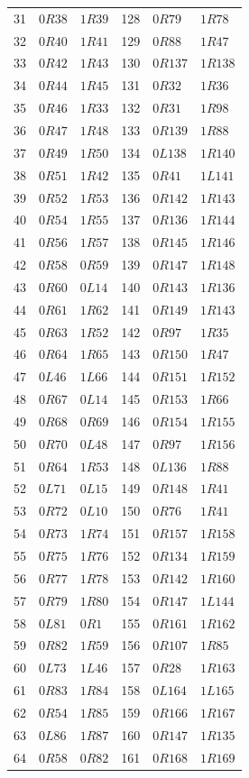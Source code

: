 \begin{longtable}{rll@{\hspace{1.6cm}}rll}
31&$0R38$&$1R39$&128&$0R79$&$1R78$\\
32&$0R40$&$1R41$&129&$0R88$&$1R47$\\
33&$0R42$&$1R43$&130&$0R137$&$1R138$\\
34&$0R44$&$1R45$&131&$0R32$&$1R36$\\
35&$0R46$&$1R33$&132&$0R31$&$1R98$\\
36&$0R47$&$1R48$&133&$0R139$&$1R88$\\
37&$0R49$&$1R50$&134&$0L138$&$1R140$\\
38&$0R51$&$1R42$&135&$0R41$&$1L141$\\
39&$0R52$&$1R53$&136&$0R142$&$1R143$\\
40&$0R54$&$1R55$&137&$0R136$&$1R144$\\
41&$0R56$&$1R57$&138&$0R145$&$1R146$\\
42&$0R58$&$0R59$&139&$0R147$&$1R148$\\
43&$0R60$&$0L14$&140&$0R143$&$1R136$\\
44&$0R61$&$1R62$&141&$0R149$&$1R143$\\
45&$0R63$&$1R52$&142&$0R97$&$1R35$\\
46&$0R64$&$1R65$&143&$0R150$&$1R47$\\
47&$0L46$&$1L66$&144&$0R151$&$1R152$\\
48&$0R67$&$0L14$&145&$0R153$&$1R66$\\
49&$0R68$&$0R69$&146&$0R154$&$1R155$\\
50&$0R70$&$0L48$&147&$0R97$&$1R156$\\
51&$0R64$&$1R53$&148&$0L136$&$1R88$\\
52&$0L71$&$0L15$&149&$0R148$&$1R41$\\
53&$0R72$&$0L10$&150&$0R76$&$1R41$\\
54&$0R73$&$1R74$&151&$0R157$&$1R158$\\
55&$0R75$&$1R76$&152&$0R134$&$1R159$\\
56&$0R77$&$1R78$&153&$0R142$&$1R160$\\
57&$0R79$&$1R80$&154&$0R147$&$1L144$\\
58&$0L81$&$0R1$&155&$0R161$&$1R162$\\
59&$0R82$&$1R59$&156&$0R107$&$1R85$\\
60&$0L73$&$1L46$&157&$0R28$&$1R163$\\
61&$0R83$&$1R84$&158&$0L164$&$1L165$\\
62&$0R54$&$1R85$&159&$0R166$&$1R167$\\
63&$0L86$&$1R87$&160&$0R147$&$1R135$\\
64&$0R58$&$0R82$&161&$0R168$&$1R169$\\

\end{longtable}
